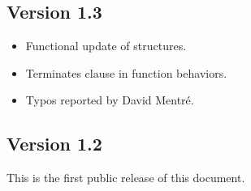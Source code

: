 \documentclass[web]{frama-c-book}
\begin{document}
\subsection{Version 1.3}
\begin{itemize}
\item Functional update of structures.
\item Terminates clause in function behaviors.
\item Typos reported by David Mentr\'e.
\end{itemize}

\subsection{Version 1.2}
This is the first public release of this document.

\cleardoublepage
{}
{}

%


\cleardoublepage
{}
{}
\listoffigures

\cleardoublepage
{}
{}
\printindex
\end{document}
